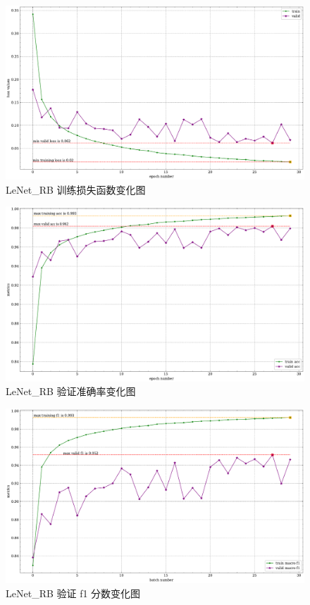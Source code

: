 \documentclass[supercite]{Experimental_Report}
\theoremstyle{definition}
\begin{document}
\begin{figure}[H]
	\begin{center}
		\includegraphics[scale=0.45]{../images/LeNetRB训练验证损失函数.pdf}
		\caption{LeNet\_RB 训练损失函数变化图}
		\label{LeNetRB训练验证损失函数}
	\end{center}
\end{figure}
\begin{figure}[H]
	\begin{center}
		\includegraphics[scale=0.45]{../images/LeNetRB训练验证acc.pdf}
		\caption{LeNet\_RB 验证准确率变化图}
		\label{LeNetRB训练验证acc}
	\end{center}
\end{figure}
\begin{figure}[H]
	\begin{center}
		\includegraphics[scale=0.45]{../images/LeNetRB训练验证f1.pdf}
		\caption{LeNet\_RB 验证 f1 分数变化图}
		\label{LeNetRB训练验证f1}
	\end{center}
\end{figure}
\end{document}
